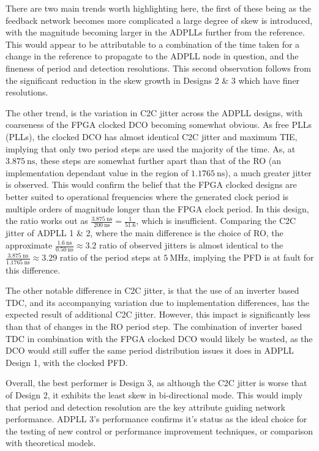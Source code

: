 There are two main trends worth highlighting here, the first of these being as the feedback network becomes more complicated a large degree of skew is introduced, with the magnitude becoming larger in the \acp{ADPLL} further from the reference. This would appear to be attributable to a combination of the time taken for a change in the reference to propagate to the \ac{ADPLL} node in question, and the fineness of period and detection resolutions. This second observation follows from the significant reduction in the skew growth in Designs 2 \& 3 which have finer resolutions. 

The other trend, is the variation in \ac{C2C} jitter across the \ac{ADPLL} designs, with coarseness of the \ac{FPGA} clocked \ac{DCO} becoming somewhat obvious. As free \aclp{PLL} (\acsp{PLL}), the clocked \ac{DCO} has almost identical \ac{C2C} jitter and maximum \ac{TIE}, implying that only two period steps are used the majority of the time. As, at $3.875~\si{\nano\second}$, these steps are somewhat further apart than that of the \ac{RO} (an implementation dependant value in the region of $1.1765~\si{\nano\second}$), a much greater jitter is observed. This would confirm the belief that the \ac{FPGA} clocked designs are better suited to operational frequencies where the generated clock period is multiple orders of magnitude longer than the \ac{FPGA} clock period. In this design, the ratio works out as $\frac{3.875~\si{\nano\second}}{200~\si{\nano\second}} = \frac{1}{51.6}$, which is insufficient. Comparing the \ac{C2C} jitter of \ac{ADPLL} 1 \& 2, where the main difference is the choice of \ac{RO}, the approximate $\frac{1.6~\si{\nano\second}}{0.50~\si{\nano\second}} \approx 3.2$ ratio of observed jitters is almost identical to the $\frac{3.875~\si{\nano\second}}{1.1765~\si{\nano\second}} \approx 3.29$ ratio of the period steps at $5~\si{\mega\hertz}$, implying the \ac{PFD} is at fault for this difference.

The other notable difference in \ac{C2C} jitter, is that the use of an inverter based \ac{TDC}, and its accompanying variation due to implementation differences, has the expected result of additional \ac{C2C} jitter. However, this impact is significantly less than that of changes in the \ac{RO} period step. The combination of inverter based \ac{TDC} in combination with the \ac{FPGA} clocked \ac{DCO} would likely be wasted, as the \ac{DCO} would still suffer the same period distribution issues it does in \ac{ADPLL} Design 1, with the clocked \ac{PFD}.

Overall, the best performer is Design 3, as although the \ac{C2C} jitter is worse that of Design 2, it exhibits the least skew in bi-directional mode. This would imply that period and detection resolution are the key attribute guiding network performance. \ac{ADPLL} 3's performance confirms it's status as the ideal choice for the testing of new control or performance improvement techniques, or comparison with theoretical models.

